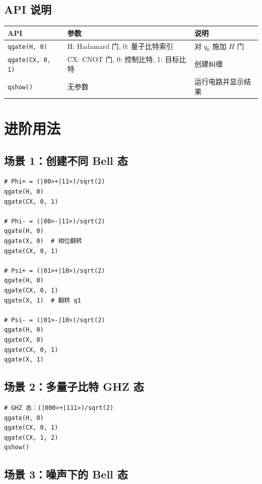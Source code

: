 \documentclass[12pt,a4paper]{article}
\begin{document}
\subsection{API 说明}

\begin{center}
\begin{tabular}{|l|l|l|}
\hline
\textbf{API} & \textbf{参数} & \textbf{说明} \\
\hline
\texttt{qgate(H, 0)} & H: Hadamard 门, 0: 量子比特索引 & 对 $q_0$ 施加 $H$ 门 \\
\hline
\texttt{qgate(CX, 0, 1)} & CX: CNOT 门, 0: 控制比特, 1: 目标比特 & 创建纠缠 \\
\hline
\texttt{qshow()} & 无参数 & 运行电路并显示结果 \\
\hline
\end{tabular}
\end{center}

\section{进阶用法}

\subsection{场景 1：创建不同 Bell 态}

\begin{lstlisting}[style=python]
# Phi+ = (|00>+|11>)/sqrt(2)
qgate(H, 0)
qgate(CX, 0, 1)

# Phi- = (|00>-|11>)/sqrt(2)
qgate(H, 0)
qgate(X, 0)  # 相位翻转
qgate(CX, 0, 1)

# Psi+ = (|01>+|10>)/sqrt(2)
qgate(H, 0)
qgate(CX, 0, 1)
qgate(X, 1)  # 翻转 q1

# Psi- = (|01>-|10>)/sqrt(2)
qgate(H, 0)
qgate(X, 0)
qgate(CX, 0, 1)
qgate(X, 1)
\end{lstlisting}

\subsection{场景 2：多量子比特 GHZ 态}

\begin{lstlisting}[style=python]
# GHZ 态：(|000>+|111>)/sqrt(2)
qgate(H, 0)
qgate(CX, 0, 1)
qgate(CX, 1, 2)
qshow()
\end{lstlisting}

\subsection{场景 3：噪声下的 Bell 态}
\end{document}
